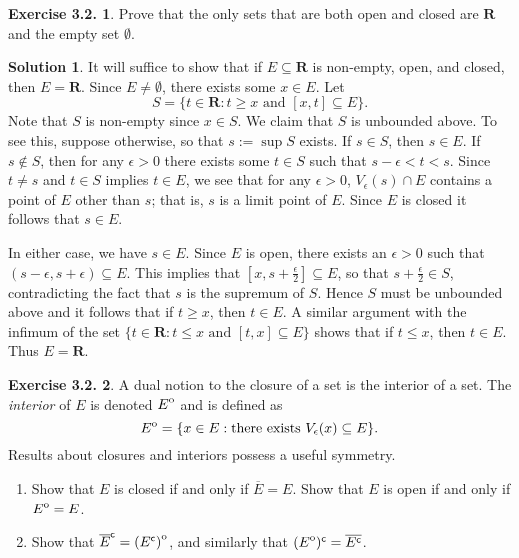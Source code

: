 \documentclass[12pt]{article}
\theoremstyle{definition}
\theoremstyle{exercise}
\newtheorem{exercise}{Exercise 3.2.}
\theoremstyle{solution}
\newtheorem*{solution}{Solution}
\newcommand{\interior}[1]{%
  {\kern0pt#1}^{\mathrm{o}}%
}
\newcommand{\setcomp}[1]{#1^{\mathsf{c}}}
\newcommand{\R}{\mathbf{R}}
\begin{document}
\begin{exercise}
\label{ex:13}
    Prove that the only sets that are both open and closed are \( \R \) and the empty set \( \emptyset \).
\end{exercise}

\begin{solution}
    It will suffice to show that if \( E \subseteq \R \) is non-empty, open, and closed, then \( E = \R \). Since \( E \neq \emptyset \), there exists some \( x \in E \). Let
    \[
        S = \{ t \in \R : t \geq x \text{ and } [x, t] \subseteq E \}.
    \]
    Note that \( S \) is non-empty since \( x \in S \). We claim that \( S \) is unbounded above. To see this, suppose otherwise, so that \( s := \sup S \) exists. If \( s \in S \), then \( s \in E \). If \( s \not\in S \), then for any \( \epsilon > 0 \) there exists some \( t \in S \) such that \( s - \epsilon < t < s \). Since \( t \neq s \) and \( t \in S \) implies \( t \in E \), we see that for any \( \epsilon > 0 \), \( V_{\epsilon}(s) \cap E \) contains a point of \( E \) other than \( s \); that is, \( s \) is a limit point of \( E \). Since \( E \) is closed it follows that \( s \in E \).

    In either case, we have \( s \in E \). Since \( E \) is open, there exists an \( \epsilon > 0 \) such that \( (s - \epsilon, s + \epsilon) \subseteq E \). This implies that \( \left[ x, s + \tfrac{\epsilon}{2} \right] \subseteq E \), so that \( s + \tfrac{\epsilon}{2} \in S \), contradicting the fact that \( s \) is the supremum of \( S \). Hence \( S \) must be unbounded above and it follows that if \( t \geq x \), then \( t \in E \). A similar argument with the infimum of the set \( \{ t \in \R : t \leq x \text{ and } [t, x] \subseteq E \} \) shows that if \( t \leq x \), then \( t \in E \). Thus \( E = \R \).
\end{solution}

\begin{exercise}
\label{ex:14}
    A dual notion to the closure of a set is the interior of a set. The \textit{interior} of \( E \) is denoted \( \interior{E} \) and is defined as
    \[
        \interior{E} = \{ x \in E : \text{there exists } V_{\epsilon}(x) \subseteq E \}.
    \]
    Results about closures and interiors possess a useful symmetry.
    \begin{enumerate}
        \item Show that \( E \) is closed if and only if \( \overline{E} = E \). Show that \( E \) is open if and only if \( \interior{E} = E \).

        \item Show that \( \setcomp{\overline{E}} = \interior{(\setcomp{E})} \), and similarly that \( \setcomp{(\interior{E})} = \overline{\setcomp{E}} \).
    \end{enumerate}
\end{exercise}
\end{document}
